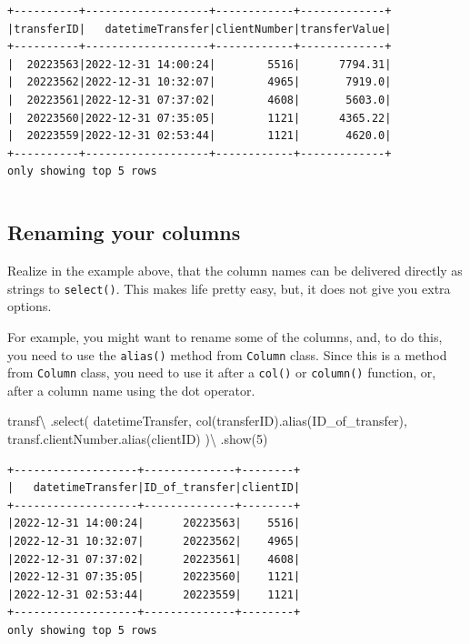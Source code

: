 \documentclass[
  11pt,
  letterpaper,
  DIV=11,
  numbers=noendperiod]{scrreprt}
\newenvironment{Shaded}{\begin{snugshade}}{\end{snugshade}}
\newcommand{\DecValTok}[1]{\textcolor[rgb]{0.68,0.00,0.00}{#1}}
\newcommand{\NormalTok}[1]{\textcolor[rgb]{0.00,0.23,0.31}{#1}}
\newcommand{\OperatorTok}[1]{\textcolor[rgb]{0.37,0.37,0.37}{#1}}
\newcommand{\StringTok}[1]{\textcolor[rgb]{0.13,0.47,0.30}{#1}}
\begin{document}
\begin{verbatim}
+----------+-------------------+------------+-------------+
|transferID|   datetimeTransfer|clientNumber|transferValue|
+----------+-------------------+------------+-------------+
|  20223563|2022-12-31 14:00:24|        5516|      7794.31|
|  20223562|2022-12-31 10:32:07|        4965|       7919.0|
|  20223561|2022-12-31 07:37:02|        4608|       5603.0|
|  20223560|2022-12-31 07:35:05|        1121|      4365.22|
|  20223559|2022-12-31 02:53:44|        1121|       4620.0|
+----------+-------------------+------------+-------------+
only showing top 5 rows
\end{verbatim}

\begin{verbatim}
\end{verbatim}

\hypertarget{renaming-your-columns}{%
\subsection{Renaming your columns}\label{renaming-your-columns}}

Realize in the example above, that the column names can be delivered
directly as strings to \texttt{select()}. This makes life pretty easy,
but, it does not give you extra options.

For example, you might want to rename some of the columns, and, to do
this, you need to use the \texttt{alias()} method from \texttt{Column}
class. Since this is a method from \texttt{Column} class, you need to
use it after a \texttt{col()} or \texttt{column()} function, or, after a
column name using the dot operator.

\begin{Shaded}
\begin{Highlighting}[]
\NormalTok{transf}\OperatorTok{\textbackslash{}}
\NormalTok{  .select(}
    \StringTok{\textquotesingle{}datetimeTransfer\textquotesingle{}}\NormalTok{,}
\NormalTok{    col(}\StringTok{\textquotesingle{}transferID\textquotesingle{}}\NormalTok{).alias(}\StringTok{\textquotesingle{}ID\_of\_transfer\textquotesingle{}}\NormalTok{),}
\NormalTok{    transf.clientNumber.alias(}\StringTok{\textquotesingle{}clientID\textquotesingle{}}\NormalTok{)}
\NormalTok{  )}\OperatorTok{\textbackslash{}}
\NormalTok{  .show(}\DecValTok{5}\NormalTok{)}
\end{Highlighting}
\end{Shaded}

\begin{verbatim}
+-------------------+--------------+--------+
|   datetimeTransfer|ID_of_transfer|clientID|
+-------------------+--------------+--------+
|2022-12-31 14:00:24|      20223563|    5516|
|2022-12-31 10:32:07|      20223562|    4965|
|2022-12-31 07:37:02|      20223561|    4608|
|2022-12-31 07:35:05|      20223560|    1121|
|2022-12-31 02:53:44|      20223559|    1121|
+-------------------+--------------+--------+
only showing top 5 rows
\end{verbatim}
\end{document}
